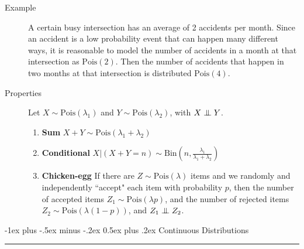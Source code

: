 \documentclass[10pt,landscape]{article}
\makeatletter
\newcommand\independent{\protect\mathpalette{\protect\independenT}{\perp}}
\def\independenT#1#2{\mathrel{\setbox0\hbox{$#1#2$}%
    \copy0\kern-\wd0\mkern4mu\box0}}
\newcommand{\Bin}{\textrm{Bin}}
\newcommand{\Pois}{\textrm{Pois}}
\renewcommand{\section}{\@startsection{section}{1}{0mm}%
                                {-1ex plus -.5ex minus -.2ex}%
                                {0.5ex plus .2ex}%
                                {\normalfont\large\bfseries}}
\makeatother
\begin{document}
\begin{multicols*}{3}
\begin{description}
    \item[Example] A certain busy intersection has an average of 2 accidents per month. Since an accident is a low probability event that can happen many different ways, it is reasonable to model the number of accidents in a month at that intersection as $\Pois(2)$. Then the number of accidents that happen in two months at that intersection is distributed $\Pois(4)$.

    \item[Properties]
Let $X \sim \Pois(\lambda_1)$ and $Y \sim \Pois(\lambda_2)$, with $X \independent Y$.

\begin{enumerate}
    \item \textbf{Sum} $X + Y \sim \Pois(\lambda_1 + \lambda_2)$
    \item \textbf{Conditional} $X | (X + Y = n) \sim \Bin\left(n, \frac{\lambda_1}{\lambda_1 + \lambda_2}\right)$
    \item \textbf{Chicken-egg} If there are $Z \sim \Pois(\lambda)$ items and we randomly and independently ``accept" each item with probability $p$, then the number of accepted items $Z_1 \sim \Pois(\lambda p)$, and the number of rejected items $Z_2 \sim \Pois(\lambda (1-p))$, and $Z_1 \independent Z_2$.
\end{enumerate}

\end{description}



\section{Continuous Distributions}\smallskip \hrule height 2pt \smallskip


\end{multicols*}
\end{document}
